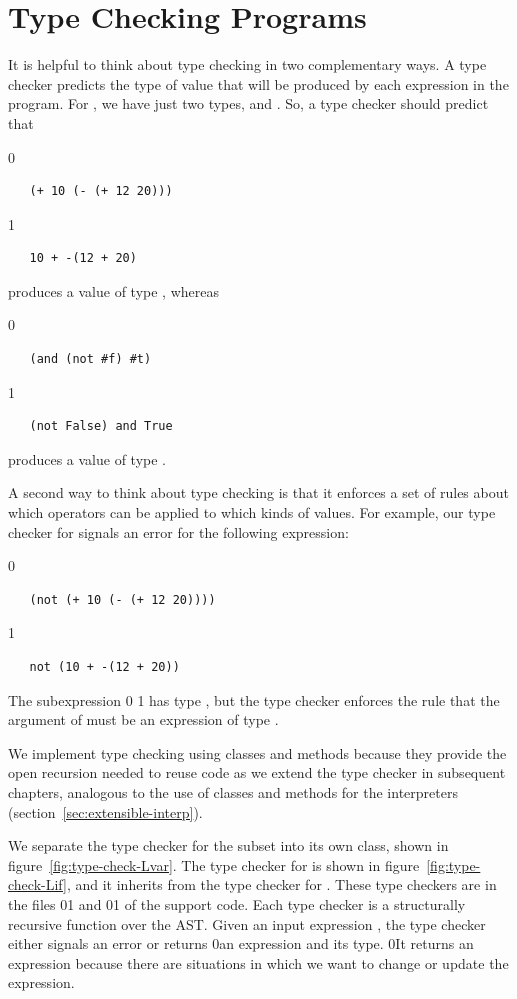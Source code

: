 \documentclass[7x10]{TimesAPriori_MIT}%
\def\racketEd{0}
\def\pythonEd{1}
\def\edition{0}
\newcommand{\racket}[1]{{\if\edition\racketEd{#1}\fi}}
\newcommand{\python}[1]{{\if\edition\pythonEd #1\fi}}
\numberwithin{theorem}{chapter}
\numberwithin{definition}{chapter}
\numberwithin{equation}{chapter}
\begin{document}
\section{Type Checking \LangIf{} Programs}
\label{sec:type-check-Lif}

It is helpful to think about type checking in two complementary
ways. A type checker predicts the type of value that will be produced
by each expression in the program.  For \LangIf{}, we have just two types,
\INTTY{} and \BOOLTY{}. So, a type checker should predict that
{\if\edition\racketEd
\begin{lstlisting}
   (+ 10 (- (+ 12 20)))
\end{lstlisting}
\fi}
{\if\edition\pythonEd
\begin{lstlisting}
   10 + -(12 + 20)
\end{lstlisting}
\fi}
\noindent produces a value of type \INTTY{}, whereas
{\if\edition\racketEd
\begin{lstlisting}
   (and (not #f) #t)
\end{lstlisting}
\fi}
{\if\edition\pythonEd
\begin{lstlisting}
   (not False) and True
\end{lstlisting}
\fi}
\noindent produces a value of type \BOOLTY{}.

A second way to think about type checking is that it enforces a set of
rules about which operators can be applied to which kinds of
values. For example, our type checker for \LangIf{} signals an error
for the following expression:
%
{\if\edition\racketEd
\begin{lstlisting}
   (not (+ 10 (- (+ 12 20))))
\end{lstlisting}
\fi}
{\if\edition\pythonEd
\begin{lstlisting}
   not (10 + -(12 + 20))
\end{lstlisting}
\fi}
\noindent The subexpression
\racket{}
\python{}
has type \INTTY{}, but the type checker enforces the rule that the
argument of  must be an expression of type \BOOLTY{}.

We implement type checking using classes and methods because they
provide the open recursion needed to reuse code as we extend the type
checker in subsequent chapters, analogous to the use of classes and methods
for the interpreters (section~\ref{sec:extensible-interp}).

We separate the type checker for the \LangVar{} subset into its own
class, shown in figure~\ref{fig:type-check-Lvar}. The type checker for
\LangIf{} is shown in figure~\ref{fig:type-check-Lif}, and it inherits
from the type checker for \LangVar{}. These type checkers are in the
files
\racket{}\python{}
and
\racket{}\python{}
of the support code.
%
Each type checker is a structurally recursive function over the AST.
Given an input expression , the type checker either signals an
error or returns \racket{an expression and} its type.
%
\racket{It returns an expression because there are situations in which
  we want to change or update the expression.}
\end{document}
